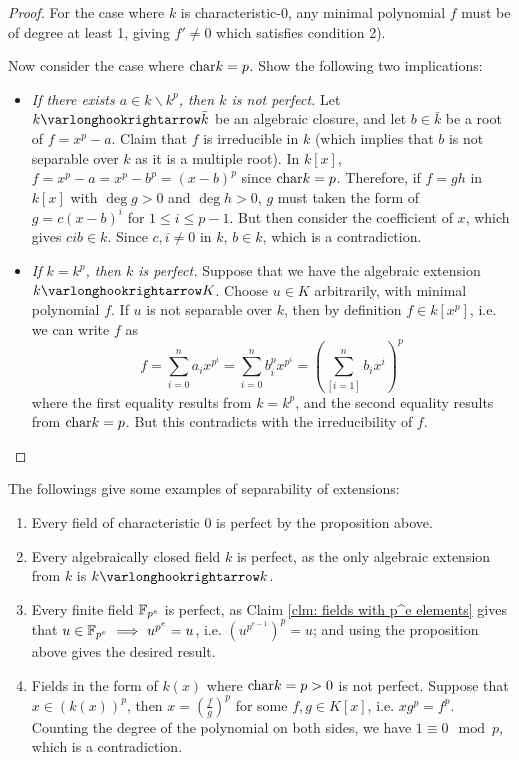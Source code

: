 \documentclass{article}
\begin{document}
\begin{proof}
    For the case where $k$ is characteristic-0, any minimal polynomial $f$ must be of degree at least 1, giving $f' \neq 0$ which satisfies condition 2).

    Now consider the case where $\mathrm{char}{k} = p$. Show the following two implications:
    \begin{itemize}
        \item \emph{If there exists $a \in k \smallsetminus k^p$, then $k$ is not perfect.} Let $k \ext \bar{k}$ be an algebraic closure, and let $b \in \bar{k}$ be a root of $f = x^p - a$. Claim that $f$ is irreducible in $k$ (which implies that $b$ is not separable over $k$ as it is a multiple root). In $k[x]$, $f = x^p - a = x^p - b^p = (x - b)^p$ since $\mathrm{char}{k} = p$. Therefore, if $f = gh$ in $k[x]$ with $\deg g > 0$ and $\deg h > 0$, $g$ must taken the form of $g = c(x - b)^i$ for $1 \leq i \leq p - 1$. But then consider the coefficient of $x$, which gives $cib \in k$. Since $c, i \neq 0$ in $k$, $b \in k$, which is a contradiction.
        \item \emph{If $k = k^p$, then $k$ is perfect.} Suppose that we have the algebraic extension $k \ext K$. Choose $u \in K$ arbitrarily, with minimal polynomial $f$. If $u$ is not separable over $k$, then by definition $f \in k[x^p]$, i.e. we can write $f$ as
        \[
            f = \sum_{i = 0}^n a_i x^{p^i} = \sum_{i = 0}^n b_i^p x^{p^i} = \left( \sum_[i = 1]^n b_i x^i \right)^p
        \]
        where the first equality results from $k = k^p$, and the second equality results from $\mathrm{char}{k} = p$. But this contradicts with the irreducibility of $f$.
    \end{itemize}
\end{proof}

\begin{example}
    The followings give some examples of separability of extensions:
    \begin{enumerate}
        \item Every field of characteristic 0 is perfect by the proposition above.
        \item Every algebraically closed field $k$ is perfect, as the only algebraic extension from $k$ is $k \ext k$.
        \item Every finite field $\mathbb{F}_{p^e}$ is perfect, as Claim \ref{clm: fields with p^e elements} gives that $u \in \mathbb{F}_{p^e} \ \Longrightarrow\  u^{p^e} = u$, i.e. $\left(u^{p^{e-1}}\right)^p = u$; and using the proposition above gives the desired result.
        \item Fields in the form of $k(x)$ where $\mathrm{char}{k} = p > 0$ is not perfect. Suppose that $x \in \left( k(x) \right)^p$, then $x = \left( \frac{f}{g} \right)^p$ for some $f, g \in K[x]$, i.e. $x g^p = f^p$. Counting the degree of the polynomial on both sides, we have $1 \equiv 0 \mod{p}$, which is a contradiction.
    \end{enumerate}
\end{example}
\end{document}
